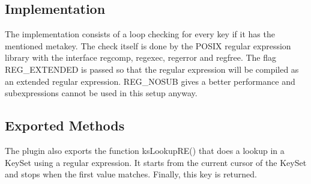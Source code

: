 \subsection*{Implementation}

The implementation consists of a loop checking for every key if it has the mentioned metakey. The check itself is done by the P\+O\+S\+IX regular expression library with the interface {\ttfamily regcomp}, {\ttfamily regexec}, {\ttfamily regerror} and {\ttfamily regfree}. The flag {\ttfamily R\+E\+G\+\_\+\+E\+X\+T\+E\+N\+D\+ED} is passed so that the regular expression will be compiled as an extended regular expression. {\ttfamily R\+E\+G\+\_\+\+N\+O\+S\+UB} gives a better performance and subexpressions cannot be used in this setup anyway.

\subsection*{Exported Methods}

The plugin also exports the function {\ttfamily ks\+Lookup\+R\+E()} that does a lookup in a Key\+Set using a regular expression. It starts from the current cursor of the Key\+Set and stops when the first value matches. Finally, this key is returned. 